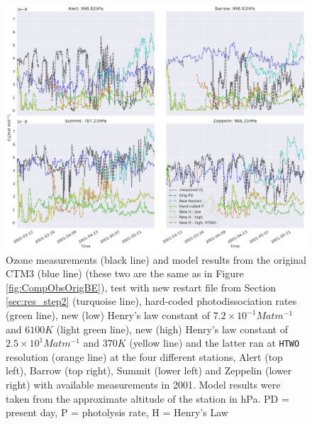 \begin{figure}[ht]
    \centering
    \includegraphics[width=\linewidth]{Chapter6_Results/images/ozone_stationComp_2001/ozone_2001_step3.png}
    \caption{Ozone measurements (black line) and model results from the original CTM3 (blue line) (these two are the same as in Figure \ref{fig:CompObsOrigBE}), test with new restart file from Section \ref{sec:res_step2} (turquoise line), hard-coded photodissociation rates (green line), new (low) Henry's law constant of $7.2\times10^{-1} M atm ^{-1}$ and $6100 K$ (light green line), new (high) Henry's law constant of $2.5\times10^{1} M atm ^{-1}$ and $370 K$ (yellow line) and the latter ran at \texttt{HTWO} resolution (orange line) at the four different stations, Alert (top left), Barrow (top right), Summit (lower left) and Zeppelin (lower right) with available measurements in 2001. Model results were taken from the approximate altitude of the station in hPa. PD = present day, P = photolysis rate, H = Henry's Law}
    \label{fig:ozone_2001_step3}
\end{figure}